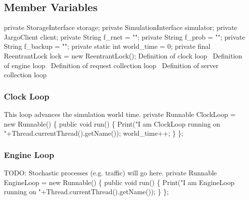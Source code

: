 \documentclass{article}
\def\nwendcode{\endtrivlist \endgroup}
\let\nwdocspar=\par
\begin{document}
\subsection{Member Variables}
\nwenddocs{}\endmoddef{}
private StorageInterface storage;
private SimulationInterface simulator;
private JargoClient client;
private String f_rnet = "";
private String f_prob = "";
private String f_backup = "";
private static int world_time = 0;
private final ReentrantLock lock = new ReentrantLock();
\LA{}Definition of clock loop~{\nwtagstyle{}}\RA{}
\LA{}Definition of engine loop~{\nwtagstyle{}}\RA{}
\LA{}Definition of request collection loop~{\nwtagstyle{}}\RA{}
\LA{}Definition of server collection loop~{\nwtagstyle{}}\RA{}
\nwendcode{}%

\subsubsection{Clock Loop}
This loop advances the simulation world time.
\nwenddocs{}\endmoddef{}
private Runnable ClockLoop = new Runnable() \{
  public void run() \{
    Print("I am ClockLoop running on "+Thread.currentThread().getName());
    world_time++;
  \}
\};
\eatline
{}\nwendcode{}\nwdocspar
\subsubsection{Engine Loop}
TODO: Stochastic processes (e.g. traffic) will go here.
\nwenddocs{}\endmoddef{}
private Runnable EngineLoop = new Runnable() \{
  public void run() \{
    Print("I am EngineLoop running on "+Thread.currentThread().getName());
  \}
\};
\eatline
{}\nwendcode{}\nwdocspar
\end{document}

